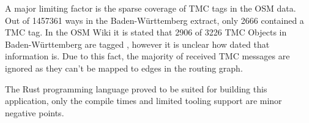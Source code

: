 \documentclass[a4paper]{scrartcl}
\begin{document}
A major limiting factor is the sparse coverage of TMC tags in the OSM data. Out of 1457361 ways in the Baden-Württemberg extract, only 2666 contained a TMC tag. In the OSM Wiki it is stated that 2906 of 3226 TMC Objects in Baden-Württemberg are tagged \cite{osm_wiki_tmc}, however it is unclear how dated that information is. Due to this fact, the majority of received TMC messages are ignored as they can't be mapped to edges in the routing graph. 


The Rust programming language proved to be suited for building this application, only the compile times and limited tooling support are minor negative points.

\printbibliography
\end{document}
